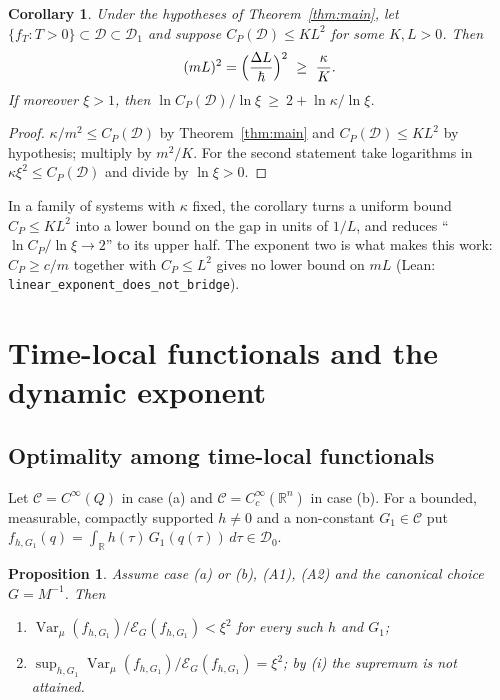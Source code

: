 \documentclass[11pt,a4paper]{article}
\newtheorem{proposition}[theorem]{Proposition}
\newtheorem{corollary}[theorem]{Corollary}
\theoremstyle{definition}
\theoremstyle{remark}
\newcommand{\R}{\mathbb{R}}
\newcommand{\Var}{\operatorname{Var}}
\newcommand{\cE}{\mathcal{E}}
\newcommand{\cD}{\mathcal{D}}
\newcommand{\code}[1]{\texttt{#1}}
\begin{document}
\begin{corollary}\label{cor:gap}
Under the hypotheses of Theorem~\ref{thm:main}, let $\{f_T:T>0\}\subset\cD\subset\cD_1$ and suppose $C_P(\cD)\le K L^2$ for some $K,L>0$. Then
\[
  (mL)^2=\Bigl(\frac{\Delta L}{\hbar}\Bigr)^2\ \ge\ \frac{\kappa}{K}.
\]
If moreover $\xi>1$, then $\ln C_P(\cD)/\ln\xi\ \ge\ 2+\ln\kappa/\ln\xi$.
\end{corollary}

\begin{proof}
$\kappa/m^2\le C_P(\cD)$ by Theorem~\ref{thm:main} and $C_P(\cD)\le KL^2$ by hypothesis; multiply by $m^2/K$.
For the second statement take logarithms in $\kappa\xi^2\le C_P(\cD)$ and divide by $\ln\xi>0$.
\end{proof}

In a family of systems with $\kappa$ fixed, the corollary turns a uniform bound $C_P\le KL^2$ into a lower bound on the gap in units of $1/L$, and reduces ``$\ln C_P/\ln\xi\to2$'' to its upper half.
The exponent two is what makes this work: $C_P\ge c/m$ together with $C_P\le L^2$ gives no lower bound on $mL$ (Lean: \code{linear\_exponent\_does\_not\_bridge}).

\section{Time-local functionals and the dynamic exponent}\label{sec:sokal}

\subsection{Optimality among time-local functionals}

Let $\mathcal C=C^\infty(Q)$ in case (a) and $\mathcal C=C_c^\infty(\R^n)$ in case (b).
For a bounded, measurable, compactly supported $h\ne0$ and a non-constant $G_1\in\mathcal C$ put $f_{h,G_1}(q)=\int_\R h(\tau)\,G_1(q(\tau))\,d\tau\in\cD_0$.

\begin{proposition}\label{prop:optimal}
Assume case (a) or (b), (A1), (A2) and the canonical choice $G=M^{-1}$. Then
\begin{enumerate}[label=(\roman*)]
\item $\Var_\mu(f_{h,G_1})/\cE_G(f_{h,G_1})<\xi^2$ for every such $h$ and $G_1$;
\item $\sup_{h,G_1}\Var_\mu(f_{h,G_1})/\cE_G(f_{h,G_1})=\xi^2$; by (i) the supremum is not attained.
\end{enumerate}
\end{proposition}
\end{document}
